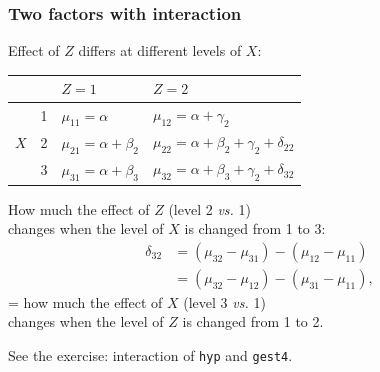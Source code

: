 \documentclass[12pt,dvipsnames,t,handout%
,aspectratio=169%
]{beamer}
\begin{document}
\begin{frame}[fragile]\frametitle{Two factors with interaction}

\bi
\item
Effect of $Z$ differs at different  levels of $X$:
\begin{center}
\begin{tabular}{llll  }
&& $Z = 1$ & $Z = 2$ \\
\hline
&1 & $\mu_{11} = \alpha$ & $\mu_{12} = \alpha + \gamma_2$\\
$X$&2 & $\mu_{21} = \alpha+\beta_2$ & $\mu_{22} = \alpha +\beta_2+ \gamma_2+\delta_{22}$\\
&3 & $\mu_{31} = \alpha+\beta_3$ & $\mu_{32} = \alpha +\beta_3+ \gamma_2+\delta_{32}$
\end{tabular}
\end{center}
\medskip
\item
How much the effect of $Z$ (level 2 {\it vs.} 1) \\ changes  when
the level of $X$ is changed  from 1 to 3:
\begin{align*}
   \delta_{32}  & = (\mu_{32} - \mu_{31}) - (\mu_{12} - \mu_{11})  \\
  & = (\mu_{32} - \mu_{12}) - (\mu_{31} - \mu_{11}),
\end{align*}
= how much the effect of  $X$ (level 3 {\it vs.} 1) \\ 
changes when
the level of $Z$ is changed from 1 to 2.
\medskip
\item See the exercise: interaction of {\tt hyp} and {\tt gest4}.
\ei
\end{frame}
\end{document}

